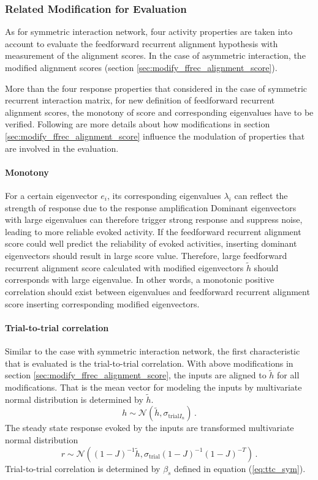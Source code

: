 \documentclass[11pt]{article}
\begin{document}
	\subsubsection{Related Modification for Evaluation} \label{sec:modification_asym}
	As for symmetric interaction network, four activity properties are taken into account to evaluate the feedforward recurrent alignment hypothesis with measurement of the alignment scores. In the case of asymmetric interaction, the modified alignment scores (section \ref{sec:modify_ffrec_alignment_score}). 
	
	More than the four response properties that considered in the case of symmetric recurrent interaction matrix, for new definition of feedforward recurrent alignment scores, the monotony of score and corresponding eigenvalues have to be verified. Following are more details about how modifications in section \ref{sec:modify_ffrec_alignment_score} influence the modulation of properties that are involved in the evaluation. 
	
	\paragraph{Monotony} For a certain eigenvector $e_i$, its corresponding eigenvalues $\lambda_i$ can reflect the strength of response due to the response amplification %
	Dominant eigenvectors with large eigenvalues can therefore trigger strong response and suppress noise, leading to more reliable evoked activity. If the feedforward recurrent alignment score could well predict the reliability of evoked activities, inserting dominant eigenvectors should result in large score value. Therefore, large feedforward recurrent alignment score calculated with modified eigenvectors $\tilde{h}$ should corresponds with large eigenvalue. In other words, a monotonic positive correlation should exist between eigenvalues and feedforward recurrent alignment score inserting corresponding modified eigenvectors. 
	
		
	\paragraph{Trial-to-trial correlation} 
	Similar to the case with symmetric interaction network, the first characteristic that is evaluated is the trial-to-trial correlation. With above modifications in section \ref{sec:modify_ffrec_alignment_score}, the inputs are aligned to $\tilde{h}$ for all modifications. That is the mean vector for modeling the inputs by multivariate normal distribution is determined by $\tilde{h}$. 
		\begin{equation}
				h \sim \mathcal{N}(\tilde{h}, \sigma_{\text{trial}I_n}) \, .
		\end{equation}
		The steady state response evoked by the inputs are transformed multivariate normal distribution
		\begin{equation}
				r \sim \mathcal{N}\left((1-J)^{-1}\tilde{h}, \sigma_{\text{trial}} (1-J)^{-1} (1-J)^{-T}\right) \, .
		\end{equation}
	Trial-to-trial correlation is determined by $\beta_s$ defined in equation (\ref{eq:ttc_sym}). 
	
\end{document}
